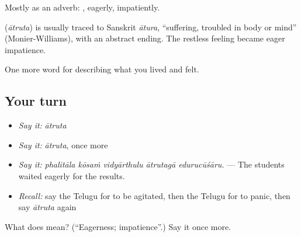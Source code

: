 Mostly as an adverb: , eagerly, impatiently.

\begin{cousinweb}
\textbf{} (\emph{ātruta}) is usually traced to Sanskrit \emph{ātura}, \textquotedblleft{}suffering, troubled in body or mind\textquotedblright{} (Monier-Williams), with an abstract ending. The restless feeling became eager impatience.
\end{cousinweb}

\begin{grammarlens}[title={What you've built}]
One more word for describing what you lived and felt.
\end{grammarlens}

\subsection*{Your turn}
\begin{itemize}
\raggedright
  \item \emph{Say it:} \emph{ātruta}
  \item \emph{Say it:} \emph{ātruta}, once more
  \item \emph{Say it:} \emph{phalitāla kōsaṁ vidyārthulu ātrutagā edurucūśāru.} — The students waited eagerly for the results.
  \item \emph{Recall:} say the Telugu for to be agitated, then the Telugu for to panic, then say \emph{ātruta} again
\end{itemize}

\begin{tcolorbox}[breakable,colback=teal!4,colframe=teal!35!black,title={Before you move on}]
What does  mean? (\textquotedblleft{}Eagerness; impatience\textquotedblright{}.) Say it once more.
\end{tcolorbox}
